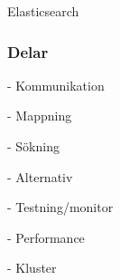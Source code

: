 \documentclass{beamer}
\begin{document}
\begin{frame}
Elasticsearch
\end{frame}

\begin{frame}
\frametitle{Delar}

- Kommunikation

- Mappning

- Sökning

- Alternativ

- Testning/monitor

- Performance

- Kluster
\end{frame}
\end{document}
